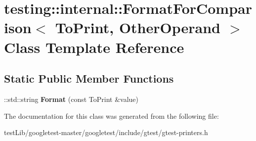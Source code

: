 \hypertarget{classtesting_1_1internal_1_1FormatForComparison}{}\section{testing\+:\+:internal\+:\+:Format\+For\+Comparison$<$ To\+Print, Other\+Operand $>$ Class Template Reference}
\label{classtesting_1_1internal_1_1FormatForComparison}
\subsection*{Static Public Member Functions}
\begin{DoxyCompactItemize}
\item 
\mbox{\label{classtesting_1_1internal_1_1FormatForComparison_a2aeb688fc55b57abd3021d82eccad896}} 
\+::std\+::string {\bfseries Format} (const To\+Print \&value)
\end{DoxyCompactItemize}


The documentation for this class was generated from the following file\+:\begin{DoxyCompactItemize}
\item 
test\+Lib/googletest-\/master/googletest/include/gtest/gtest-\/printers.\+h\end{DoxyCompactItemize}
